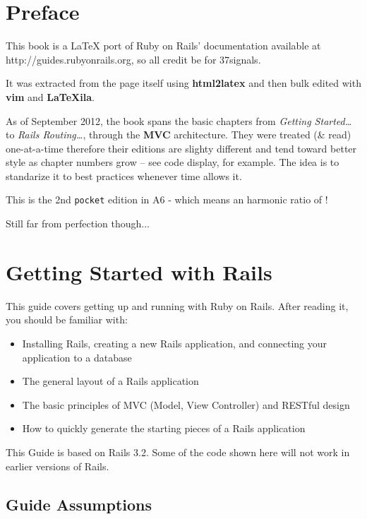 \documentclass[10pt]{book}
\begin{document}
\tableofcontents

\footnotesize

\chapter*{Preface}

This book is a \LaTeX{} port of Ruby on Rails' documentation available at http://guides.rubyonrails.org, so all credit be for 37signals.

It was extracted from the page itself using \textbf{html2latex} and then bulk edited with \textbf{vim} and \textbf{LaTeXila}.

As of September 2012, the book spans the basic chapters from \textit{Getting Started\ldots} to \textit{Rails Routing\ldots}, through the \textbf{MVC} architecture.
They were treated (\& read) one-at-a-time therefore their editions are slighty different and tend toward better style as chapter numbers grow -- see code display, for example. The idea is to standarize it to best practices whenever time allows it.

This is the 2nd \texttt{pocket} edition in A6 - which means an harmonic ratio of !

Still far from perfection though...

\chapter{Getting Started with Rails}

This guide covers getting up and running with Ruby on Rails. After reading it, you should be familiar with:
\begin{itemize}
	\item Installing Rails, creating a new Rails application, and connecting your application to a database
	\item The general layout of a Rails application
	\item The basic principles of MVC (Model, View Controller) and RESTful design
	\item How to quickly generate the starting pieces of a Rails application
\end{itemize}


This Guide is based on Rails 3.2. Some of the code shown here will not work in earlier versions of Rails.

\section{ Guide Assumptions}
\end{document}
